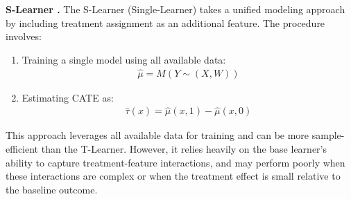 \documentclass{article} %
\begin{document}
\textbf{S-Learner \citep{kunzel2019metalearners}.} The S-Learner (Single-Learner) takes a unified modeling approach by including treatment assignment as an additional feature. The procedure involves:

\begin{enumerate}[leftmargin=20pt, itemsep=0pt,parsep=0pt,partopsep=0pt,topsep=0pt]
    \item Training a single model using all available data:
        \begin{align*}
            \hat{\mu} = M(Y \sim (X, W))    
        \end{align*}
    \item Estimating CATE as: 
        \begin{align*}
            \hat{\tau}(x) = \hat{\mu}(x, 1) - \hat{\mu}(x, 0)
        \end{align*}
\end{enumerate}
This approach leverages all available data for training and can be more sample-efficient than the T-Learner. However, it relies heavily on the base learner's ability to capture treatment-feature interactions, and may perform poorly when these interactions are complex or when the treatment effect is small relative to the baseline outcome.
\end{document}
